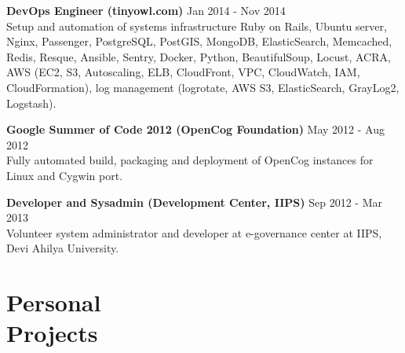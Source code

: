 \documentclass[margin,line]{resume}
\begin{document}
\begin{resume}
\begin{list2}
    \item \textbf{DevOps Engineer (tinyowl.com)} \hspace{70mm} Jan 2014 - Nov 2014 \\ Setup and automation of systems infrastructure Ruby on Rails, Ubuntu server, Nginx, Passenger, PostgreSQL, PostGIS, MongoDB, ElasticSearch, Memcached, Redis, Resque, Ansible, Sentry, Docker, Python, BeautifulSoup, Locust, ACRA, AWS (EC2, S3, Autoscaling, ELB, CloudFront, VPC, CloudWatch, IAM, CloudFormation), log management (logrotate, AWS S3, ElasticSearch, GrayLog2, Logstash).
    
	\item \textbf{Google Summer of Code 2012 (OpenCog Foundation)} \hspace{30mm} May 2012 - Aug 2012 \\ Fully automated build, packaging and deployment of OpenCog instances for Linux and Cygwin port.

	\item \textbf{Developer and Sysadmin (Development Center, IIPS)} \hspace{30mm} Sep 2012 - Mar 2013 \\ Volunteer system administrator and developer at e-governance center at IIPS, Devi Ahilya University.

	\end{list2}

    \section{\mysidestyle Personal \\ Projects} 
	\begin{list2}


\end{list2}
\end{resume}
\end{document}
